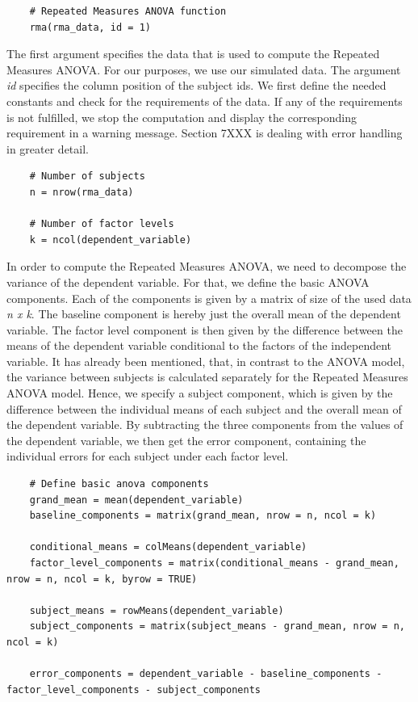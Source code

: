 \documentclass[11pt]{article}
\begin{document}
	\begin{lstlisting}
	# Repeated Measures ANOVA function
	rma(rma_data, id = 1)					
	\end{lstlisting}
	
	The first argument specifies the data that is used to compute the Repeated Measures ANOVA. For our purposes, we use our simulated data. The argument \textit{id} specifies the column position of the subject ids. We first define the needed constants and check for the requirements of the data. If any of the requirements is not fulfilled, we stop the computation and display the corresponding requirement in a warning message. Section 7XXX is dealing with error handling in greater detail.\\
	
	\begin{lstlisting}
	# Number of subjects
	n = nrow(rma_data)
	
	# Number of factor levels
	k = ncol(dependent_variable)
	\end{lstlisting}   
	
	In order to compute the Repeated Measures ANOVA, we need to decompose the variance of the dependent variable. For that, we define the basic ANOVA components. Each of the components is given by a matrix of size of the used data \textit{n x k}. The baseline component is hereby just the overall mean of the dependent variable. The factor level component is then given by the difference between the means of the dependent variable conditional to the factors of the independent variable. It has already been mentioned, that, in contrast to the ANOVA model, the variance between subjects is calculated separately for the Repeated Measures ANOVA model. Hence, we specify a subject component, which is given by the difference between the individual means of each subject and the overall mean of the dependent variable. By subtracting the three components from the values of the dependent variable, we then get the error component, containing the individual errors for each subject under each factor level.\\
	
	\begin{lstlisting}  
	# Define basic anova components    
	grand_mean = mean(dependent_variable)
	baseline_components = matrix(grand_mean, nrow = n, ncol = k)
	
	conditional_means = colMeans(dependent_variable)
	factor_level_components = matrix(conditional_means - grand_mean, nrow = n, ncol = k, byrow = TRUE)
	
	subject_means = rowMeans(dependent_variable)
	subject_components = matrix(subject_means - grand_mean, nrow = n, ncol = k)
	
	error_components = dependent_variable - baseline_components - factor_level_components - subject_components
	\end{lstlisting}  
	
\end{document}
